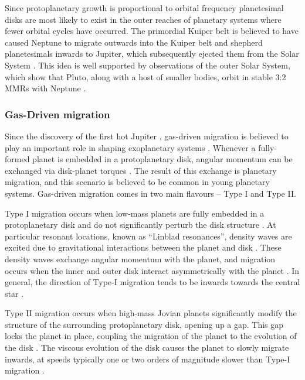 \documentclass[12pt,letter]{aastex}
\begin{document}
Since protoplanetary growth is proportional to orbital frequency \citep{Rafikov2003} planetesimal disks are most likely to exist in the outer reaches of planetary systems where fewer orbital cycles have occurred. 
The primordial Kuiper belt is believed to have caused Neptune to migrate outwards into the Kuiper belt and shepherd planetesimals inwards to Jupiter, which subsequently ejected them from the Solar System \citep{Fernandez1984}.
This idea is well supported by observations of the outer Solar System, which show that Pluto, along with a host of smaller bodies, orbit in stable 3:2 MMRs with Neptune \citep{Malhotra1993, Malhotra1995}.

\subsubsection{Gas-Driven migration}
Since the discovery of the first hot Jupiter \citep{Mayor1995}, gas-driven migration is believed to play an important role in shaping exoplanetary systems \citep{Lin1996}.
Whenever a fully-formed planet is embedded in a protoplanetary disk, angular momentum can be exchanged via disk-planet torques \citep{Goldreich1980}.
The result of this exchange is planetary migration, and this scenario is believed to be common in young planetary systems. 
Gas-driven migration comes in two main flavours -- Type I and Type II. 

Type I migration occurs when low-mass planets are fully embedded in a protoplanetary disk and do not significantly perturb the disk structure \citep{Armitage2010}. 
At particular resonant locations, known as ``Linblad resonances'', density waves are excited due to gravitational interactions between the planet and disk \citep{Goldreich1979}. 
These density waves exchange angular momentum with the planet, and migration occurs when the inner and outer disk interact asymmetrically with the planet \citep{Goldreich1979}.
In general, the direction of Type-I migration tends to be inwards towards the central star \citep{Ward1997}.

Type II migration occurs when high-mass Jovian planets significantly modify the structure of the surrounding protoplanetary disk, opening up a gap. 
This gap locks the planet in place, coupling the migration of the planet to the evolution of the disk \citep{Lin1986}.
The viscous evolution of the disk causes the planet to slowly migrate inwards, at speeds typically one or two orders of magnitude slower than Type-I migration \citep{Ward1997}.
\end{document}
